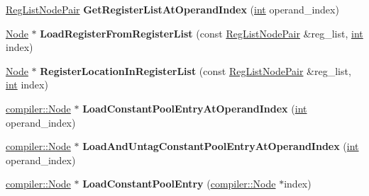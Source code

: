 \begin{DoxyCompactItemize}
\mbox{\hyperlink{classv8_1_1internal_1_1interpreter_1_1InterpreterAssembler_1_1RegListNodePair}{Reg\+List\+Node\+Pair}} {\bfseries Get\+Register\+List\+At\+Operand\+Index} (\mbox{\hyperlink{classint}{int}} operand\+\_\+index)
\item 
\mbox{\label{classv8_1_1internal_1_1interpreter_1_1InterpreterAssembler_ab9796d2a5d735ca2d427c742e50d0834}} 
\mbox{\hyperlink{classv8_1_1internal_1_1compiler_1_1Node}{Node}} $\ast$ {\bfseries Load\+Register\+From\+Register\+List} (const \mbox{\hyperlink{classv8_1_1internal_1_1interpreter_1_1InterpreterAssembler_1_1RegListNodePair}{Reg\+List\+Node\+Pair}} \&reg\+\_\+list, \mbox{\hyperlink{classint}{int}} index)
\item 
\mbox{\label{classv8_1_1internal_1_1interpreter_1_1InterpreterAssembler_a038f78eaf00db957bf26cd66725c11c1}} 
\mbox{\hyperlink{classv8_1_1internal_1_1compiler_1_1Node}{Node}} $\ast$ {\bfseries Register\+Location\+In\+Register\+List} (const \mbox{\hyperlink{classv8_1_1internal_1_1interpreter_1_1InterpreterAssembler_1_1RegListNodePair}{Reg\+List\+Node\+Pair}} \&reg\+\_\+list, \mbox{\hyperlink{classint}{int}} index)
\item 
\mbox{\label{classv8_1_1internal_1_1interpreter_1_1InterpreterAssembler_ab42ce953824c36bf09dc1d2fb6a8b522}} 
\mbox{\hyperlink{classv8_1_1internal_1_1compiler_1_1Node}{compiler\+::\+Node}} $\ast$ {\bfseries Load\+Constant\+Pool\+Entry\+At\+Operand\+Index} (\mbox{\hyperlink{classint}{int}} operand\+\_\+index)
\item 
\mbox{\label{classv8_1_1internal_1_1interpreter_1_1InterpreterAssembler_ae119f7e4d3b869385e4e9c5d075b6d62}} 
\mbox{\hyperlink{classv8_1_1internal_1_1compiler_1_1Node}{compiler\+::\+Node}} $\ast$ {\bfseries Load\+And\+Untag\+Constant\+Pool\+Entry\+At\+Operand\+Index} (\mbox{\hyperlink{classint}{int}} operand\+\_\+index)
\item 
\mbox{\label{classv8_1_1internal_1_1interpreter_1_1InterpreterAssembler_a0ed0d9f661e2c84adad0f5ef97f7d3b5}} 
\mbox{\hyperlink{classv8_1_1internal_1_1compiler_1_1Node}{compiler\+::\+Node}} $\ast$ {\bfseries Load\+Constant\+Pool\+Entry} (\mbox{\hyperlink{classv8_1_1internal_1_1compiler_1_1Node}{compiler\+::\+Node}} $\ast$index)

\end{DoxyCompactItemize}
